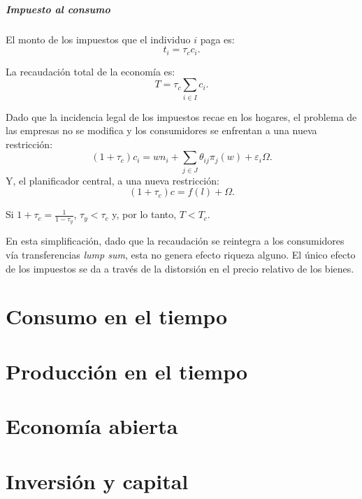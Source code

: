 \documentclass[8pt,a4paper]{extarticle}
\begin{document}
\begin{multicols}{3}
	\subsubsection{Impuesto al consumo}

	El monto de los impuestos que el individuo $i$ paga es:
	\[
		t_i = \tau_c c_i
		.\]

	\begin{boxprop}[]
		La recaudación total de la economía es:
		\[
			T = \tau_c \sum_{i \in I} c_i
			.\]
	\end{boxprop}

	\begin{boxrmk}[]
		Dado que la incidencia legal de los impuestos recae en los hogares, el problema de las empresas no se modifica y los consumidores se enfrentan a una nueva restricción:
		\[
			(1 + \tau_c)c_i = wn_i + \sum_{j \in J} \theta_{ij}\pi_j(w) + \varepsilon_i\Omega
			.\]
		Y, el planificador central, a una nueva restricción:
		\[
			(1 + \tau_c) c = f(l) + \Omega
			.\]
	\end{boxrmk}

	\begin{boxprop}[]
		Si $\displaystyle 1 + \tau_c = \frac{1}{1 - \tau_y}$, $\tau_y < \tau_c$ y, por lo tanto, $T < T_c$.
	\end{boxprop}

	\begin{boxrmk}[]
		En esta simplificación, dado que la recaudación se reintegra a los consumidores vía transferencias \emph{lump sum}, esta no genera efecto riqueza alguno. El único efecto de los impuestos se da a través de la distorsión en el precio relativo de los bienes.
	\end{boxrmk}

	\newpage

	\part{Consumo en el tiempo}

	\newpage

	\part{Producción en el tiempo}

	\newpage

	\part{Economía abierta}

	\newpage

	\part{Inversión y capital}

	\vfill\eject
	\columnbreak
\end{multicols}
\end{document}
